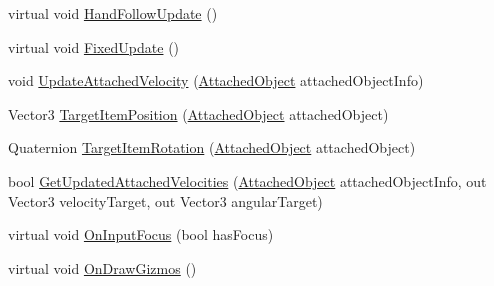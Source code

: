 \begin{DoxyCompactItemize}
\item 
virtual void \mbox{\hyperlink{class_valve_1_1_v_r_1_1_interaction_system_1_1_hand_a745bd3dbc5fba431b5e25052ba86931f}{Hand\+Follow\+Update}} ()
\item 
virtual void \mbox{\hyperlink{class_valve_1_1_v_r_1_1_interaction_system_1_1_hand_a5789f17ac9d2a2a7fa0a48b712a33150}{Fixed\+Update}} ()
\item 
void \mbox{\hyperlink{class_valve_1_1_v_r_1_1_interaction_system_1_1_hand_af0e434a30d589846fd61538d0c50d851}{Update\+Attached\+Velocity}} (\mbox{\hyperlink{struct_valve_1_1_v_r_1_1_interaction_system_1_1_hand_1_1_attached_object}{Attached\+Object}} attached\+Object\+Info)
\item 
Vector3 \mbox{\hyperlink{class_valve_1_1_v_r_1_1_interaction_system_1_1_hand_ab1ab126c3dffe760a7f66bccfa0fd381}{Target\+Item\+Position}} (\mbox{\hyperlink{struct_valve_1_1_v_r_1_1_interaction_system_1_1_hand_1_1_attached_object}{Attached\+Object}} attached\+Object)
\item 
Quaternion \mbox{\hyperlink{class_valve_1_1_v_r_1_1_interaction_system_1_1_hand_af914f594b0cdf64f757e57e4dbdda887}{Target\+Item\+Rotation}} (\mbox{\hyperlink{struct_valve_1_1_v_r_1_1_interaction_system_1_1_hand_1_1_attached_object}{Attached\+Object}} attached\+Object)
\item 
bool \mbox{\hyperlink{class_valve_1_1_v_r_1_1_interaction_system_1_1_hand_ab81ca68cad92354d9b14d2f534ac1b94}{Get\+Updated\+Attached\+Velocities}} (\mbox{\hyperlink{struct_valve_1_1_v_r_1_1_interaction_system_1_1_hand_1_1_attached_object}{Attached\+Object}} attached\+Object\+Info, out Vector3 velocity\+Target, out Vector3 angular\+Target)
\item 
virtual void \mbox{\hyperlink{class_valve_1_1_v_r_1_1_interaction_system_1_1_hand_a6a7b4c4ed02dd68f5515e1951d8c1ffd}{On\+Input\+Focus}} (bool has\+Focus)
\item 
virtual void \mbox{\hyperlink{class_valve_1_1_v_r_1_1_interaction_system_1_1_hand_a7edee98254742907c27330ca8e5c7e42}{On\+Draw\+Gizmos}} ()
\end{DoxyCompactItemize}
